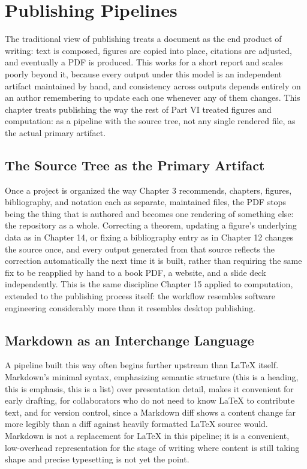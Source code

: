 \hypertarget{chapter-18-publishing-pipelines}{%
\chapter{Publishing Pipelines}\label{chapter-18-publishing-pipelines}}

The traditional view of publishing treats a document as the end product of writing: text is composed, figures are copied into place, citations are adjusted, and eventually a PDF is produced. This works for a short report and scales poorly beyond it, because every output under this model is an independent artifact maintained by hand, and consistency across outputs depends entirely on an author remembering to update each one whenever any of them changes. This chapter treats publishing the way the rest of Part VI treated figures and computation: as a pipeline with the source tree, not any single rendered file, as the actual primary artifact.

\hypertarget{the-source-tree-as-the-primary-artifact}{%
\section{The Source Tree as the Primary Artifact}\label{the-source-tree-as-the-primary-artifact}}

Once a project is organized the way Chapter 3 recommends, chapters, figures, bibliography, and notation each as separate, maintained files, the PDF stops being the thing that is authored and becomes one rendering of something else: the repository as a whole. Correcting a theorem, updating a figure's underlying data as in Chapter 14, or fixing a bibliography entry as in Chapter 12 changes the source once, and every output generated from that source reflects the correction automatically the next time it is built, rather than requiring the same fix to be reapplied by hand to a book PDF, a website, and a slide deck independently. This is the same discipline Chapter 15 applied to computation, extended to the publishing process itself: the workflow resembles software engineering considerably more than it resembles desktop publishing.

\hypertarget{markdown-as-an-interchange-language}{%
\section{Markdown as an Interchange Language}\label{markdown-as-an-interchange-language}}

A pipeline built this way often begins further upstream than LaTeX itself. Markdown's minimal syntax, emphasizing semantic structure (this is a heading, this is emphasis, this is a list) over presentation detail, makes it convenient for early drafting, for collaborators who do not need to know LaTeX to contribute text, and for version control, since a Markdown diff shows a content change far more legibly than a diff against heavily formatted LaTeX source would. Markdown is not a replacement for LaTeX in this pipeline; it is a convenient, low-overhead representation for the stage of writing where content is still taking shape and precise typesetting is not yet the point.

